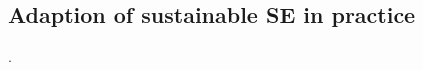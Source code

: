 \documentclass[oribibl]{llncs}
\begin{document}
\subsection{Adaption of sustainable SE in practice}

\cite{penzenstadler_systematic_2014}. %
\end{document}
